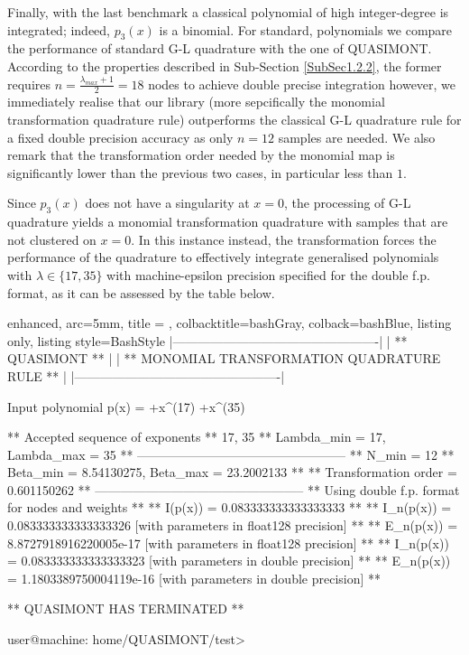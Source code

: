\documentclass[a4paper, twosided]{book}
\begin{document}
\noindent
Finally, with the last benchmark a classical polynomial of high integer-degree is integrated; indeed, $p_3(x)$ is a binomial. For standard, polynomials we compare the performance of standard  G-L quadrature with the one of QUASIMONT. According to the properties described in Sub-Section \ref{SubSec1.2.2}, the former requires $n=\frac{\lambda_{max}+1}{2}=18$ nodes to achieve double precise integration however, we immediately realise that our library (more sepcifically the monomial transformation quadrature rule) outperforms the classical G-L quadrature rule for a fixed double precision accuracy as only $n=12$ samples are needed. We also remark  that the transformation order needed by the monomial map is significantly lower than the previous two cases, in particular less than $1$.

\newpage
\noindent
Since $p_3(x)$ does not have a singularity at $x=0$, the processing of G-L quadrature yields a monomial transformation quadrature with samples that are not clustered on $x=0$. In this instance instead, the transformation forces the performance of the quadrature to effectively integrate generalised polynomials with $\lambda\in\{17,35\}$ with machine-epsilon precision specified for the double f.p. format, as it can be assessed by the table below.

\vspace{0.2cm}
\begin{tcblisting}{enhanced,
                   arc=5mm,
                   title = \color{black}{\large \ttfamily Building and executing the test driver: p\_3(x)},
                   colbacktitle=bashGray,
                   colback=bashBlue,
                   listing only,
                   listing style=BashStyle}           
    |-------------------------------------------------|
    |                 ** QUASIMONT **                 |
    |  ** MONOMIAL TRANSFORMATION QUADRATURE RULE **  |
    |-------------------------------------------------|
    
Input polynomial p(x) =  +x^(17)  +x^(35) 

 ** Accepted sequence of exponents ** 
    {17, 35}
 ** Lambda_min = 17, Lambda_max = 35 **
 --------------------------------------------------
 ** N_min = 12
 ** Beta_min = 8.54130275, Beta_max = 23.2002133 **
 ** Transformation order = 0.601150262 **
 --------------------------------------------------
 ** Using double f.p. format for nodes and weights **
 ** I(p(x))   = 0.083333333333333333 **
 ** I_n(p(x)) = 0.083333333333333326    [with parameters in float128 precision] **
 ** E_n(p(x)) = 8.8727918916220005e-17  [with parameters in float128 precision] **
 ** I_n(p(x)) = 0.083333333333333323    [with parameters in double precision] **
 ** E_n(p(x)) = 1.1803389750004119e-16  [with parameters in double precision] **

 ** QUASIMONT HAS TERMINATED **

user@machine: home/QUASIMONT/test>
\end{tcblisting}
\vspace{0.3cm}
\end{document}
